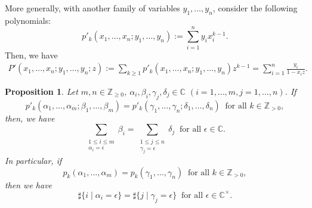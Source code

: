 \documentclass[12pt,a4paper]{amsart}
\newtheorem{prop}[thm]{Proposition}
\theoremstyle{definition}
\numberwithin{equation}{subsection}
\begin{document}
More generally, with another family of variables $y_1,\dots,y_n$, consider the following polynomials:
\[
  p'_k(x_1,\dots,x_n;y_1,\dots,y_n) := \sum_{i=1}^n y_i x_i^{k-1}.
\]
Then, we have
\begin{align}\label{eq: generating function for p'}
  P'(x_1,\dots,x_n;y_1,\dots,y_n;z) := \sum_{k \geq 1} p'_k(x_1,\dots,x_n;y_1,\dots,y_n) z^{k-1} = \sum_{i=1}^n \frac{y_i}{1-x_iz}.
\end{align}

\begin{prop}\label{prop: coincidence of p'}
  Let $m,n \in \mathbb{Z}_{\geq 0}$, $\alpha_i,\beta_i,\gamma_j,\delta_j \in \mathbb{C}$ $(i=1,\dots,m,j=1,\dots,n)$.
  If
  \[
    p'_k(\alpha_1,\dots,\alpha_m;\beta_1,\dots,\beta_m) = p'_k(\gamma_1,\dots,\gamma_n;\delta_1,\dots,\delta_n) \ \text{ for all } k \in \mathbb{Z}_{> 0},
  \]
  then, we have
  \[
    \sum_{\substack{1 \leq i \leq m\\\alpha_i=\epsilon}} \beta_i = \sum_{\substack{1 \leq j \leq n\\\gamma_j=\epsilon}} \delta_j \ \text{ for all } \epsilon \in \mathbb{C}.
  \]
  In particular, if
  \[
    p_k(\alpha_1,\dots,\alpha_m) = p_k(\gamma_1,\dots,\gamma_n) \ \text{ for all } k \in \mathbb{Z}_{> 0},
  \]
  then we have
  \[
    \sharp\{ i \mid \alpha_i = \epsilon \} = \sharp\{ j \mid \gamma_j = \epsilon \} \ \text{ for all } \epsilon \in \mathbb{C}^\times.
  \]
\end{prop}
\end{document}
